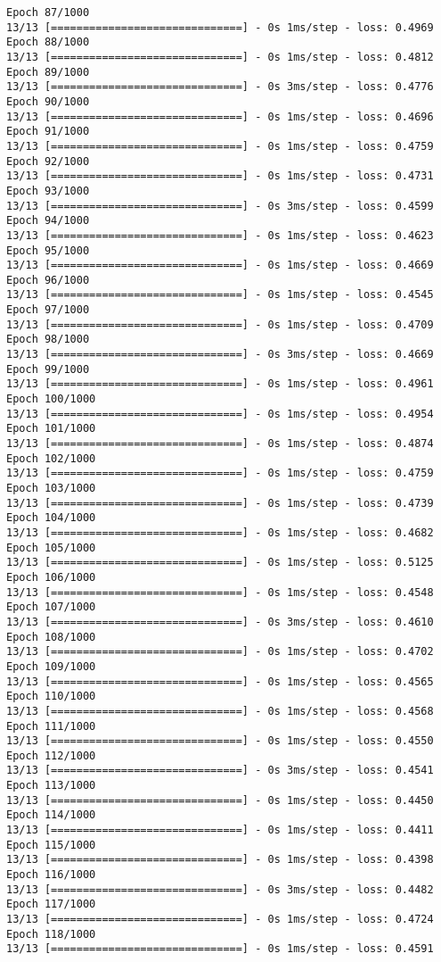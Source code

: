 \documentclass[11pt]{article}
\begin{document}
\begin{Verbatim}[commandchars=\\\{\}]
Epoch 87/1000
13/13 [==============================] - 0s 1ms/step - loss: 0.4969
Epoch 88/1000
13/13 [==============================] - 0s 1ms/step - loss: 0.4812
Epoch 89/1000
13/13 [==============================] - 0s 3ms/step - loss: 0.4776
Epoch 90/1000
13/13 [==============================] - 0s 1ms/step - loss: 0.4696
Epoch 91/1000
13/13 [==============================] - 0s 1ms/step - loss: 0.4759
Epoch 92/1000
13/13 [==============================] - 0s 1ms/step - loss: 0.4731
Epoch 93/1000
13/13 [==============================] - 0s 3ms/step - loss: 0.4599
Epoch 94/1000
13/13 [==============================] - 0s 1ms/step - loss: 0.4623
Epoch 95/1000
13/13 [==============================] - 0s 1ms/step - loss: 0.4669
Epoch 96/1000
13/13 [==============================] - 0s 1ms/step - loss: 0.4545
Epoch 97/1000
13/13 [==============================] - 0s 1ms/step - loss: 0.4709
Epoch 98/1000
13/13 [==============================] - 0s 3ms/step - loss: 0.4669
Epoch 99/1000
13/13 [==============================] - 0s 1ms/step - loss: 0.4961
Epoch 100/1000
13/13 [==============================] - 0s 1ms/step - loss: 0.4954
Epoch 101/1000
13/13 [==============================] - 0s 1ms/step - loss: 0.4874
Epoch 102/1000
13/13 [==============================] - 0s 1ms/step - loss: 0.4759
Epoch 103/1000
13/13 [==============================] - 0s 1ms/step - loss: 0.4739
Epoch 104/1000
13/13 [==============================] - 0s 1ms/step - loss: 0.4682
Epoch 105/1000
13/13 [==============================] - 0s 1ms/step - loss: 0.5125
Epoch 106/1000
13/13 [==============================] - 0s 1ms/step - loss: 0.4548
Epoch 107/1000
13/13 [==============================] - 0s 3ms/step - loss: 0.4610
Epoch 108/1000
13/13 [==============================] - 0s 1ms/step - loss: 0.4702
Epoch 109/1000
13/13 [==============================] - 0s 1ms/step - loss: 0.4565
Epoch 110/1000
13/13 [==============================] - 0s 1ms/step - loss: 0.4568
Epoch 111/1000
13/13 [==============================] - 0s 1ms/step - loss: 0.4550
Epoch 112/1000
13/13 [==============================] - 0s 3ms/step - loss: 0.4541
Epoch 113/1000
13/13 [==============================] - 0s 1ms/step - loss: 0.4450
Epoch 114/1000
13/13 [==============================] - 0s 1ms/step - loss: 0.4411
Epoch 115/1000
13/13 [==============================] - 0s 1ms/step - loss: 0.4398
Epoch 116/1000
13/13 [==============================] - 0s 3ms/step - loss: 0.4482
Epoch 117/1000
13/13 [==============================] - 0s 1ms/step - loss: 0.4724
Epoch 118/1000
13/13 [==============================] - 0s 1ms/step - loss: 0.4591

\end{Verbatim}
\end{document}
